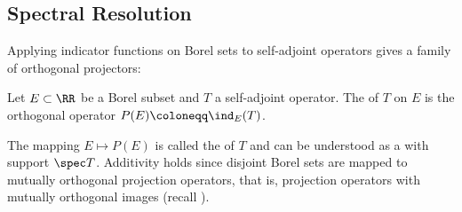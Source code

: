 \documentclass[oneside,reqno,letterpaper]{amsart}
\begin{document}




\subsection{Spectral Resolution}
Applying indicator functions on Borel sets to self-adjoint operators gives a family of orthogonal projectors:

\begin{definition*}
  Let \(E \subset \RR\) be a Borel subset and \(T\) a self-adjoint operator. 
  The  of \(T\) on \(E\) is the orthogonal operator \(P(E) \coloneqq \ind_{E}(T)\). 
\end{definition*}

The mapping \(E \mapsto P(E)\) is called the  of \(T\) and can be understood as a  with support \(\spec T\).
Additivity holds since disjoint Borel sets are mapped to mutually orthogonal projection operators, that is, projection operators with mutually orthogonal images (recall ). 
\end{document}
